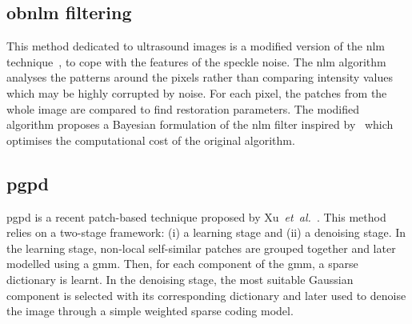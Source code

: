 




\subsection{\acf{obnlm} filtering}

This method dedicated to ultrasound images is a modified version of the \ac{nlm} technique~\cite{obnlm}, to cope with the features of the speckle noise.
The \ac{nlm} algorithm analyses the patterns around the pixels rather than comparing intensity values which may be highly corrupted by noise.
For each pixel, the patches from the whole image are compared to find restoration parameters.
The modified algorithm proposes a Bayesian formulation of the \ac{nlm} filter inspired by~\cite{bayesian} which optimises the computational cost of the original algorithm. 

\subsection{\acf{pgpd}}
\ac{pgpd} is a recent patch-based technique proposed by Xu~\emph{et~al.}~\cite{xu2015patch}.
This method relies on a two-stage framework: (i) a learning stage and (ii) a denoising stage.
In the learning stage, non-local self-similar patches are grouped together and later modelled using a \ac{gmm}.
Then, for each component of the \ac{gmm}, a sparse dictionary is learnt.
In the denoising stage, the most suitable Gaussian component is selected with its corresponding dictionary and later used to denoise the image through a simple weighted sparse coding model.